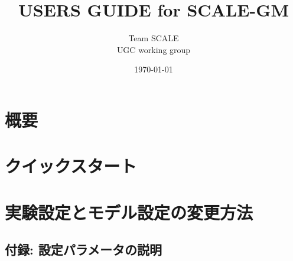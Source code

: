 \documentclass[a4paper]{jreport}
\title{{\Huge USERS GUIDE for SCALE-GM\\
        \vspace{2cm}{\Large Version \version} }}
\author{\Large Team SCALE\\ UGC working group}
\date{\today}
\begin{document}
\maketitle

\clearpage
\tableofcontents

\chapter{概要}\label{chap:overview}


\chapter{クイックスタート}\label{chap:quickstart}


\chapter{実験設定とモデル設定の変更方法}\label{chap:settings}


%

\clearpage


\begin{appendix}
\chapter{付録: 設定パラメータの説明}

\end{appendix}

\end{document}
